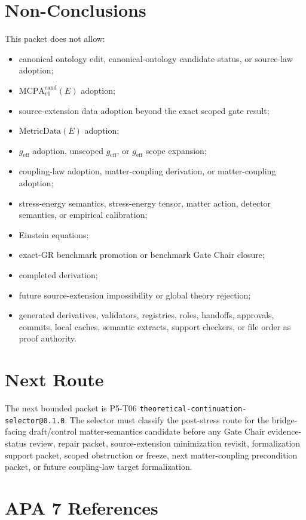 \documentclass[11pt]{article}
\newcommand{\MetricData}{\mathrm{MetricData}}
\newcommand{\geff}{g_{\mathrm{eff}}}
\newcommand{\MCPA}{\mathrm{MCPA}^{\mathrm{cand}}_{v1}}
\begin{document}
\section{Non-Conclusions}

This packet does not allow:
\begin{itemize}[leftmargin=*]
\item canonical ontology edit, canonical-ontology candidate status, or source-law adoption;
\item \(\MCPA(E)\) adoption;
\item source-extension data adoption beyond the exact scoped gate result;
\item \(\MetricData(E)\) adoption;
\item \(\geff\) adoption, unscoped \(\geff\), or \(\geff\) scope expansion;
\item coupling-law adoption, matter-coupling derivation, or matter-coupling adoption;
\item stress-energy semantics, stress-energy tensor, matter action, detector semantics, or empirical calibration;
\item Einstein equations;
\item exact-GR benchmark promotion or benchmark Gate Chair closure;
\item completed derivation;
\item future source-extension impossibility or global theory rejection;
\item generated derivatives, validators, registries, roles, handoffs, approvals, commits, local caches, semantic extracts, support checkers, or file order as proof authority.
\end{itemize}

\section{Next Route}

The next bounded packet is P5-T06
\texttt{theoretical-continuation-selector@0.1.0}. The selector must classify
the post-stress route for the bridge-facing draft/control matter-semantics
candidate before any Gate Chair evidence-status review, repair packet,
source-extension minimization revisit, formalization support packet, scoped
obstruction or freeze, next matter-coupling precondition packet, or future
coupling-law target formalization.

\section{APA 7 References}
\end{document}
